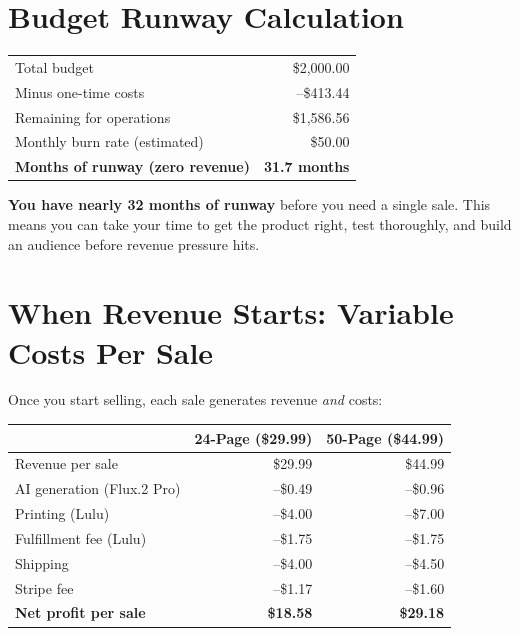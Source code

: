 \documentclass[12pt, letterpaper, oneside]{book}
\begin{document}
\section{Budget Runway Calculation}

\begin{table}[H]
\centering
\begin{tabular}{lr}
\toprule
Total budget & \$2{,}000.00 \\
Minus one-time costs & --\$413.44 \\
\midrule
Remaining for operations & \$1{,}586.56 \\
Monthly burn rate (estimated) & \$50.00 \\
\midrule
\textbf{Months of runway (zero revenue)} & \textbf{31.7 months} \\
\bottomrule
\end{tabular}
\end{table}

\begin{successbox}
\textbf{You have nearly 32 months of runway} before you need a single sale. This means you can take your time to get the product right, test thoroughly, and build an audience before revenue pressure hits.
\end{successbox}

\section{When Revenue Starts: Variable Costs Per Sale}

Once you start selling, each sale generates revenue \textit{and} costs:

\begin{table}[H]
\centering
\begin{tabular}{lrr}
\toprule
& \textbf{24-Page (\$29.99)} & \textbf{50-Page (\$44.99)} \\
\midrule
Revenue per sale & \$29.99 & \$44.99 \\
AI generation (Flux.2 Pro) & --\$0.49 & --\$0.96 \\
Printing (Lulu) & --\$4.00 & --\$7.00 \\
Fulfillment fee (Lulu) & --\$1.75 & --\$1.75 \\
Shipping & --\$4.00 & --\$4.50 \\
Stripe fee & --\$1.17 & --\$1.60 \\
\midrule
\textbf{Net profit per sale} & \textcolor{success}{\textbf{\$18.58}} & \textcolor{success}{\textbf{\$29.18}} \\
\bottomrule
\end{tabular}
\end{table}
\end{document}
